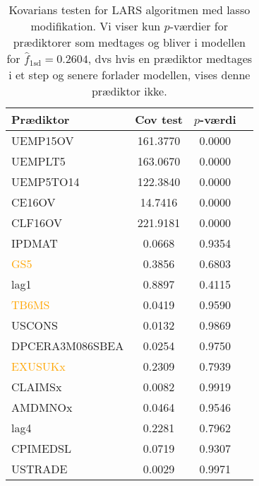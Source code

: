 \begin{table}[ht] 
\centering 
\begin{tabular}{lccc}
\toprule
Prædiktor & Cov test & \(p\)-værdi \\
\midrule
\textcolor{blue3}{UEMP15OV}    &       161.3770  &0.0000\\
\textcolor{blue3}{UEMPLT5}   &      163.0670 & 0.0000\\
\textcolor{blue3}{UEMP5TO14}    &    122.3840&  0.0000\\
\textcolor{blue3}{CE16OV}         &   14.7416 & 0.0000\\
\textcolor{blue3}{CLF16OV}        &   221.9181 & 0.0000\\
\textcolor{chartreuse4}{IPDMAT}         &    0.0668&  0.9354\\
\textcolor{orange}{GS5}&   0.3856 & 0.6803\\
\textcolor{blue3}{lag1}       &      0.8897 & 0.4115\\
\textcolor{orange}{TB6MS}  &    0.0419 & 0.9590\\
\textcolor{blue3}{USCONS} &    0.0132&  0.9869\\
\textcolor{blue3}{ DPCERA3M086SBEA}          &  0.0254 & 0.9750\\
\textcolor{orange}{ EXUSUKx} &     0.2309 & 0.7939\\
\textcolor{blue3}{CLAIMSx} &      0.0082 &  0.9919\\
\textcolor{red3}{ AMDMNOx}  &     0.0464 & 0.9546\\
\textcolor{blue3}{lag4 }     &    0.2281&  0.7962\\
\textcolor{cadetblue2}{CPIMEDSL}  &   0.0719&  0.9307\\
\textcolor{blue3}{USTRADE}   &     0.0029 &  0.9971\\ \bottomrule
\end{tabular}
\caption{Kovarians testen for LARS algoritmen med lasso modifikation.
Vi viser kun \(p\)-værdier for prædiktorer som medtages og bliver i modellen for \(\widehat{f}_{1\text{sd}}=0.2604\), dvs hvis en prædiktor medtages i et step og senere forlader modellen, vises denne prædiktor ikke.} \label{tab:covTest}
\end{table} 
